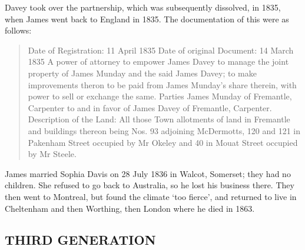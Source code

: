Davey took over the partnership, which was subsequently dissolved, in 1835, when James went back to England in 1835. The documentation of this were as follows:
\begin{quotation}
Date of Registration: 11 April 1835
Date of original Document: 14 March 1835
A power of attorney to empower James Davey to manage the joint property of James Munday and the said James Davey; to make improvements theron to be paid from James Munday's share therein, with power to sell or exchange the same. Parties James Munday of Fremantle, Carpenter to and in favor of James Davey of Fremantle, Carpenter.
Description of the Land:
All those Town allotments of land in Fremantle and buildings thereon being
Nos. 93 adjoining McDermotts,
120 and 121 in Pakenham Street occupied by Mr Okeley and
40 in Mouat Street occupied by Mr Steele.
\end{quotation}

James married Sophia Davis on 28 July 1836 in Walcot, Somerset; they had no children.  She refused to go back to Australia, so he lost his business there. They then went to Montreal, but found the climate `too fierce', and returned to live in Cheltenham and then Worthing, then London where he died in 1863.

\subsection{THIRD GENERATION}

